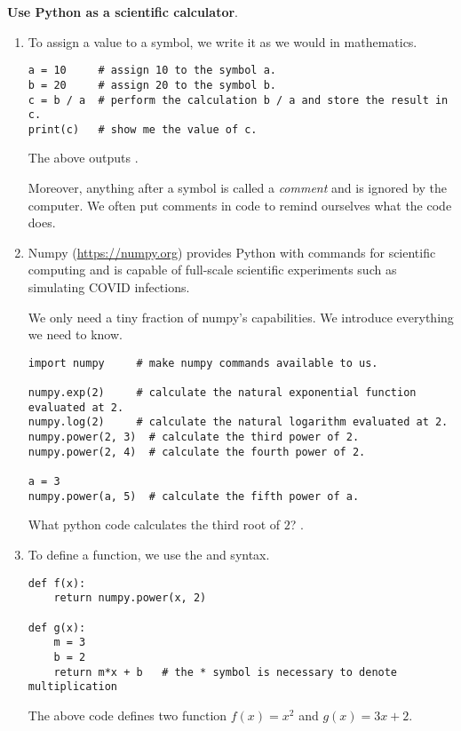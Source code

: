 \documentclass[../main.tex]{subfiles}
\begin{document}
\textbf{Use Python as a scientific calculator}.
\begin{enumerate}
  \item To assign a value to a symbol, we write it as we would in mathematics. 
    \begin{verbatim}
a = 10     # assign 10 to the symbol a.
b = 20     # assign 20 to the symbol b.
c = b / a  # perform the calculation b / a and store the result in c.
print(c)   # show me the value of c.
    \end{verbatim}
    \faComment{} The above outputs \underline{\hspace{3in}}.

    Moreover, anything after a \pythoninline{#} symbol is called a \emph{comment} and is ignored by the computer.  We often put comments in code to remind ourselves what the code does.

  \item Numpy (\url{https://numpy.org}) provides Python with commands for scientific computing and is capable of full-scale scientific experiments such as simulating COVID infections.

    We only need a tiny fraction of numpy's capabilities. We introduce everything we need to know.

    \begin{verbatim}
import numpy     # make numpy commands available to us.

numpy.exp(2)     # calculate the natural exponential function evaluated at 2.
numpy.log(2)     # calculate the natural logarithm evaluated at 2.
numpy.power(2, 3)  # calculate the third power of 2.
numpy.power(2, 4)  # calculate the fourth power of 2.

a = 3
numpy.power(a, 5)  # calculate the fifth power of a.
    \end{verbatim}

    \faComment{} What python code calculates the third root of \(2\)? \underline{\hspace{2in}}.

  \item To define a function, we use the  and  syntax.

    \begin{verbatim}
def f(x):
    return numpy.power(x, 2)

def g(x):
    m = 3
    b = 2
    return m*x + b   # the * symbol is necessary to denote multiplication
    \end{verbatim}
    The above code defines two function \(f(x) = x^{2}\) and \(g(x) = 3x + 2\).


\end{enumerate}
\end{document}
